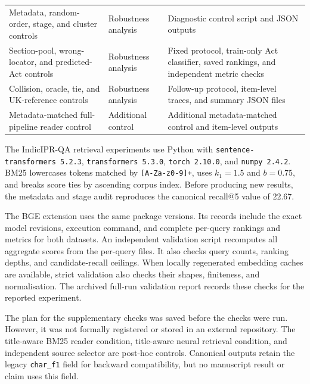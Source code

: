 \documentclass[pdflatex,sn-basic]{sn-jnl}%
\theoremstyle{thmstyleone}%
\theoremstyle{thmstyletwo}%
\theoremstyle{thmstylethree}%
\begin{document}
\begin{table}[!htbp]
\begin{tabular}{@{}
        >{\raggedright\arraybackslash}p{4.0cm}
        >{\raggedright\arraybackslash}p{2.0cm}
        >{\raggedright\arraybackslash}p{6.0cm}@{}}
        Metadata, random-order, stage, and cluster controls
        & Robustness analysis
        & Diagnostic control script and JSON outputs \\
        \addlinespace[2pt]

        Section-pool, wrong-locator, and predicted-Act controls
        & Robustness analysis
        & Fixed protocol, train-only Act classifier, saved rankings, and
        independent metric checks \\
        \addlinespace[2pt]

        Collision, oracle, tie, and UK-reference controls
        & Robustness analysis
        & Follow-up protocol, item-level traces, and summary JSON files \\
        \addlinespace[2pt]

        Metadata-matched full-pipeline reader control
        & Additional control
        & Additional metadata-matched control and item-level outputs \\
        \bottomrule
    \end{tabular}
\end{table}

The IndicIPR-QA retrieval experiments use Python with
\texttt{sentence-transformers 5.2.3}, \texttt{transformers 5.3.0},
\texttt{torch 2.10.0}, and \texttt{numpy 2.4.2}. BM25 lowercases tokens matched
by \texttt{[A-Za-z0-9]+}, uses $k_1=1.5$ and $b=0.75$, and breaks score ties
by ascending corpus index. Before producing new results, the metadata and stage
audit reproduces the canonical recall@5 value of 22.67.

The BGE extension uses the same package versions. Its records include the
exact model revisions, execution command, and complete per-query rankings and
metrics for both datasets. An independent validation script recomputes all
aggregate scores from the per-query files. It also checks query counts, ranking
depths, and candidate-recall ceilings. When locally regenerated embedding
caches are available, strict validation also checks their shapes, finiteness,
and normalisation. The archived full-run validation report records these checks
for the reported experiment.

The plan for the supplementary checks was saved before the checks were run.
However, it was not formally registered or stored in an external repository.
The title-aware BM25 reader condition, title-aware neural retrieval condition,
and independent source selector are post-hoc controls. Canonical outputs retain
the legacy \texttt{char\_f1} field for backward compatibility, but no
manuscript result or claim uses this field.
\end{document}
